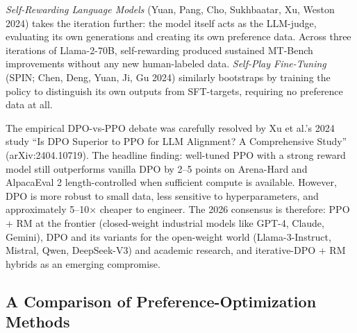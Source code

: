 \emph{Self-Rewarding Language Models} (Yuan, Pang, Cho, Sukhbaatar, Xu, Weston 2024) takes the iteration further: the model itself acts as the LLM-judge, evaluating its own generations and creating its own preference data. Across three iterations of Llama-2-70B, self-rewarding produced sustained MT-Bench improvements without any new human-labeled data. \emph{Self-Play Fine-Tuning} (SPIN; Chen, Deng, Yuan, Ji, Gu 2024) similarly bootstraps by training the policy to distinguish its own outputs from SFT-targets, requiring no preference data at all.

The empirical DPO-vs-PPO debate was carefully resolved by Xu et al.'s 2024 study ``Is DPO Superior to PPO for LLM Alignment? A Comprehensive Study'' (arXiv:2404.10719). The headline finding: well-tuned PPO with a strong reward model still outperforms vanilla DPO by 2--5 points on Arena-Hard and AlpacaEval 2 length-controlled when sufficient compute is available. However, DPO is more robust to small data, less sensitive to hyperparameters, and approximately 5--10× cheaper to engineer. The 2026 consensus is therefore: PPO + RM at the frontier (closed-weight industrial models like GPT-4, Claude, Gemini), DPO and its variants for the open-weight world (Llama-3-Instruct, Mistral, Qwen, DeepSeek-V3) and academic research, and iterative-DPO + RM hybrids as an emerging compromise.

\subsection{A Comparison of Preference-Optimization Methods}\label{a-comparison-of-preference-optimization-methods}

